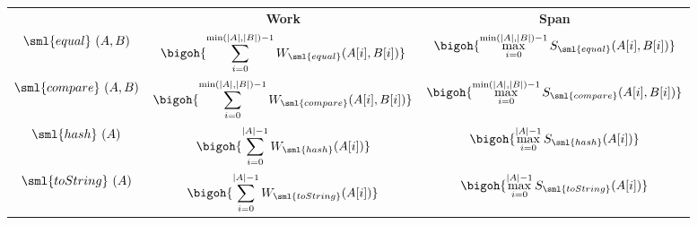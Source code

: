 \begin{costspec}[MkSeqElt]
\label{cost:sequence}
\begin{tabular}{c|c|c}
& \textbf{Work} & \textbf{Span} \\
$\sml{equal}~(A,B)$ & $\displaystyle \bigoh{\sum_{i=0}^{\min(|A|, |B|) - 1} W_{\sml{equal}}(A[i], B[i])}$ & $\displaystyle \bigoh {\max_{i=0}^{\min(|A|, |B|) - 1} S_{\sml{equal}} (A[i], B[i])}$ \\
$\sml{compare}~(A,B)$ & $\displaystyle \bigoh{\sum_{i=0}^{\min(|A|, |B|) - 1} W_{\sml{compare}}(A[i], B[i])}$ & $\displaystyle \bigoh {\max_{i=0}^{\min(|A|, |B|) - 1} S_{\sml{compare}} (A[i], B[i])}$ \\
$\sml{hash}~(A)$ & $\displaystyle \bigoh{\sum_{i=0}^{|A| - 1} W_{\sml{hash}}(A[i])}$ & $\displaystyle \bigoh {\max_{i=0}^{|A| - 1} S_{\sml{hash}} (A[i])}$ \\
$\sml{toString}~(A)$ & $\displaystyle \bigoh{\sum_{i=0}^{|A| - 1} W_{\sml{toString}}(A[i])}$ & $\displaystyle \bigoh {\max_{i=0}^{|A| - 1} S_{\sml{toString}} (A[i])}$ \\
\end{tabular}
\end{costspec}
        